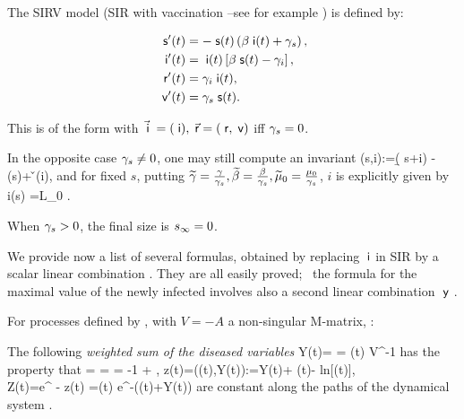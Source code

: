 \beXa \iffalse
The SIR model has been  useful for modeling qualitatively the current COVID-19 pandemic. In this context, it is useful to further divide the removed compartment into recovered (R)  and dead  (D).
Under some  objectives
this may not be necessary,  since the final size of the dead is  simply proportional to the final size of the removed; however, this model allows including a   vaccination controlled parameter $\v$ and  recovering individuals becoming  again susceptible, at a  rate $\rho$.
\fi
The  SIRV model (SIR with vaccination --see for example \cite{BBG}) is defined by:

\begin{align}
\;\mathsf s'(t)&=  -\;\mathsf s(t) \left(\beta \;\mathsf i(t)+ \gamma_s\right) ,\nonumber\\
\;\mathsf i'(t)&= \;\mathsf i(t)\left[\beta \;\mathsf s(t)-\gamma_i \right],\label{sirV}
\\
\; \mathsf r'(t)&=   \gamma_i \;\mathsf i(t),\nonumber\\
\; \mathsf v'(t)&=\gamma_s \;\mathsf s (t). \nonumber
\end{align}
\iffalse

\figu{sirv}{Plot of the states of \eqr{sirV}, for $\b=.4,\; \g_s=.05,\;\g_i=.06,\; s_0=.99,\; i_0=1-s_0,\; r_0=v_0=0 $
   }{.8}%
   \fi

This is of the form  with $\vec {\;\mathsf i} \; =(\;\mathsf i), \; \vec {\mathsf r}=(\; \mathsf r,\; \mathsf v)$ iff $\gamma_s=0$.

In the opposite case $\gamma_s \neq 0$, one may still compute an invariant
\mu(s,i):=\b( s+i) -\g \ln(s)+ \v \ln(i), \ee
and for fixed $s$, putting $\widetilde {\gamma}=\frac {\gamma} {\gamma_s}, \widetilde {\beta}=\frac {\beta} {\gamma_s}, \widetilde \mu_0=\frac {\mu_0} {\gamma_s}$, \ith
 $i$ is explicitly given by
 i(s) =L_0 .\ee



 \im When $\gamma_s > 0$, the final size is $s_\infty=0$.


\eeXa



{We provide now a list of several  formulas,  obtained by replacing  $\;\mathsf i$ in SIR  by a  scalar
linear combination  \cite{Feng}. They are all easily proved; \how\
 the formula  for the
maximal value of the newly infected involves also a second linear combination $\; \mathsf y $ . }

\beP {}
For processes defined by , with $V=-A$ a non-singular M-matrix, \ith:
\BEN

\im The following  \textit{weighted sum of the diseased variables}   \cite[(24)]{Feng}
\be{Y}
Y(t)=  = \; \vi (t)  \;  V^{-1} \bb
\ee
has the property that
  =  =
\fr { \vi (t) \bb \; \pr{  \s(t) \;    \mR -1}}{-{\mR} \s(t)\; \vi  (t)  \bb}=
 -1 + \frac{1}{\mR \s}, \ee
\bc  z(t)=\mu(\s(t),Y(t)):=Y(t)+ \s(t)- {\mR} {ln[\s(t)]},\\
 Z(t)=e^{ -{\mR} z(t)} =\s(t) e^{-\mR (\s(t)+Y(t))} \ec\ee
are constant along the paths of the dynamical system .

